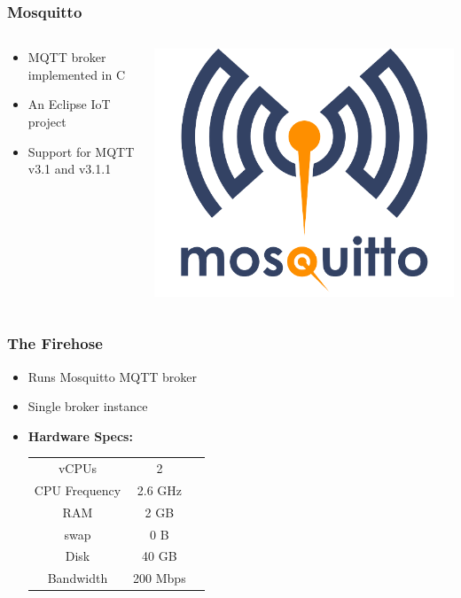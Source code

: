 \documentclass[aspectratio=169,11pt,hyperref={colorlinks=true}]{beamer}
\begin{document}
\begin{frame}
    \frametitle{Mosquitto}
    \begin{columns}[T]
        \begin{column}{.48\textwidth}
            \begin{itemize}
                \item MQTT broker implemented in C
                \item An Eclipse IoT project
                \item Support for MQTT v3.1 and v3.1.1
            \end{itemize}
        \end{column}
        \begin{column}{.48\textwidth}
            \includegraphics[width=\textwidth]{mosquitto.png}
        \end{column}
    \end{columns}
\end{frame}


\begin{frame}
    \frametitle{The Firehose}
    \begin{itemize}
        \item Runs Mosquitto MQTT broker
        \item Single broker instance
        \item \textbf{Hardware Specs:}
        \begin{center}
            \begin{tabular}{ccc}
                \hline
                vCPUs & 2 \\
                CPU Frequency & 2.6 GHz \\
                RAM & 2 GB \\
                swap  & 0 B \\
                Disk & 40 GB \\
                Bandwidth & 200 Mbps \\
                \hline
            \end{tabular}
        \end{center}
    \end{itemize}
\end{frame}
\end{document}
